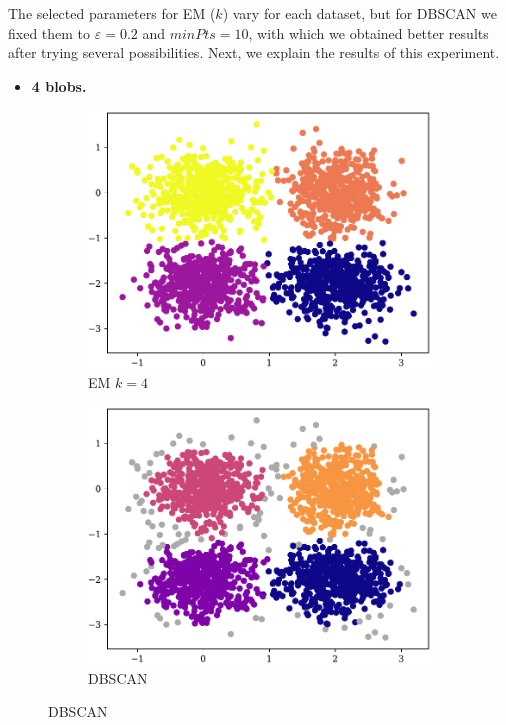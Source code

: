 The selected parameters for EM ($k$) vary for each dataset, but for DBSCAN we fixed them to $\varepsilon = 0.2$ and $minPts = 10$, with which we obtained better results after trying several possibilities. Next, we explain the results of this experiment.
\begin{itemize}
    \item \textbf{4 blobs.} 
\end{itemize}
\begin{figure}[t!]
    \begin{subfigure}[b]{0.45\textwidth}
            \includegraphics[width=\textwidth]{../plots/4-4_pred_em.pdf}
            \caption{EM $k = 4$}
            \label{subfig:4-4-em}
    \end{subfigure}
    \hspace{0.09\textwidth}
    \begin{subfigure}[b]{0.45\textwidth}
        \includegraphics[width=\textwidth]{../plots/4-4_pred_dbscan.pdf}
        \caption{DBSCAN}
        \label{subfig:4-4-dbscan}
    \end{subfigure}
\end{figure}
